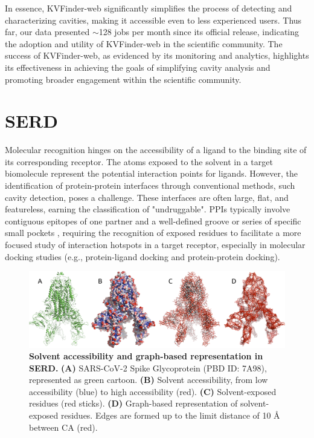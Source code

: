 \documentclass[Ingles]{phdthesis}
\def\eg{e.g.\onedot}
\begin{document}
In essence, KVFinder-web significantly simplifies the process of detecting and characterizing cavities, making it accessible even to less experienced users. Thus far, our data presented $\sim$128 jobs per month since its official release, indicating the adoption and utility of KVFinder-web in the scientific community. The success of KVFinder-web, as evidenced by its monitoring and analytics, highlights its effectiveness in achieving the goals of simplifying cavity analysis and promoting broader engagement within the scientific community.

\section{SERD \label{sec:serd}}

Molecular recognition hinges on the accessibility of a ligand to the binding site of its corresponding receptor. The atoms exposed to the solvent in a target biomolecule represent the potential interaction points for ligands. However, the identification of protein-protein interfaces through conventional methods, such cavity detection, poses a challenge. These interfaces are often large, flat, and featureless, earning the classification of "undruggable". \acsp{PPI} typically involve contiguous epitopes of one partner and a well-defined groove or series of specific small pockets \cite{jubb2012}, requiring the recognition of exposed residues to facilitate a more focused study of interaction hotspots in a target receptor, especially in molecular docking studies (\eg, protein-ligand docking and protein-protein docking).

\begin{figure}[h]
  \centering
  \includegraphics[scale=0.475]{images/serd-spyke.png}
  \caption[Solvent accessibility and graph-based representation in SERD.]{\textbf{Solvent accessibility and graph-based representation in SERD.} \textbf{(A)} SARS-CoV-2 Spike Glycoprotein (PBD ID: 7A98), represented as green cartoon. \textbf{(B)} Solvent accessibility, from low accessibility (blue) to high accessibility (red). \textbf{(C)} Solvent-exposed residues (red sticks). \textbf{(D)} Graph-based representation of solvent-exposed residues. Edges are formed up to the limit distance of 10 Å between \acs{CA} (red).}
  \label{fig:serd-spyke}
\end{figure}
\end{document}
